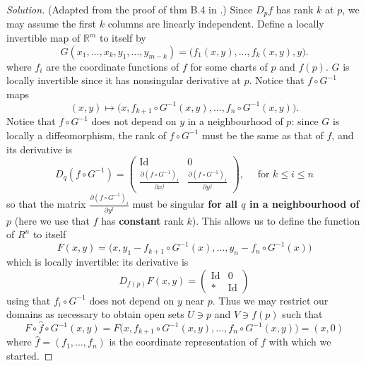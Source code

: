 \begin{proof}[Solution]\leavevmode
	(Adapted from the proof of thm B.4 in \cite{tus}.) Since \(D_{p}f\) has rank \(k\) at \(p\), we may assume the first \(k\) columns are linearly independent. Define a locally invertible map of \(\mathbb{R}^m\) to itself by
\[G(x_1,\ldots,x_k,y_1,\ldots,y_{m-k})=\Big(f_1(x,y),\ldots,f_k(x,y),y\Big).\]
where \(f_i\) are the coordinate functions of $f$ for some charts of \(p\) and \(f(p)\). \(G\) is locally invertible since it has nonsingular derivative at \(p\). Notice that \(f \circ G^{-1}\) maps 
\[(x,y) \mapsto \Big(x,f_{k+1} \circ G^{-1}(x,y),\ldots,f_{n} \circ G^{-1}(x,y)\Big).\]
{\color{6}Notice that \(f \circ G^{-1}\) does not depend on \(y\) in a neighbourhood of \(p\):} since \(G\) is locally a diffeomorphism, the rank of \(f \circ G^{-1}\) must be the same as that of \(f\), and its derivative is
\[D_q(f \circ G^{-1})=\begin{pmatrix}\operatorname{Id}&0\\ \frac{\partial (f \circ G^{-1})_i}{\partial x^j} &\frac{\partial (f \circ G^{-1})_i}{\partial y^j}\end{pmatrix},\quad\text{ for }  k \leq i \leq n\]
so that the matrix \(\frac{\partial (f \circ G^{-1})_i}{\partial y^j}\) must be singular \textbf{for all $q$ in a neighbourhood of $p$} (here we use that $f$ has \textbf{constant} rank \(k\)). This allows us to define the function of \(R^n\) to itself
\[F(x,y)=\Big(x,y_1-f_{k+1}\circ G^{-1}(x),\ldots,y_n-f_n \circ G^{-1}(x) \Big) \]
which is locally invertible: its derivative is
\[D_{f(p)}F(x,y)=\begin{pmatrix}\operatorname{Id}&0\\ *&\operatorname{Id}\end{pmatrix}\]
using that \(f_i \circ G^{-1}\) does not depend on \(y\) near $p$. Thus we may restrict our domains as necessary to obtain open sets  \(U \ni p\) and \(V \ni f(p)\) such that
\[F \circ \hat{f} \circ G^{-1}(x,y)=F\Big(x,f_{k+1} \circ G^{-1}(x,y),\ldots,f_{n} \circ G^{-1}(x,y)\Big)=(x,0)\]
where \(\hat{f}=(f_1,\ldots,f_n)\) is the coordinate representation of $f$ with which we started.

\end{proof}
\iffalse
